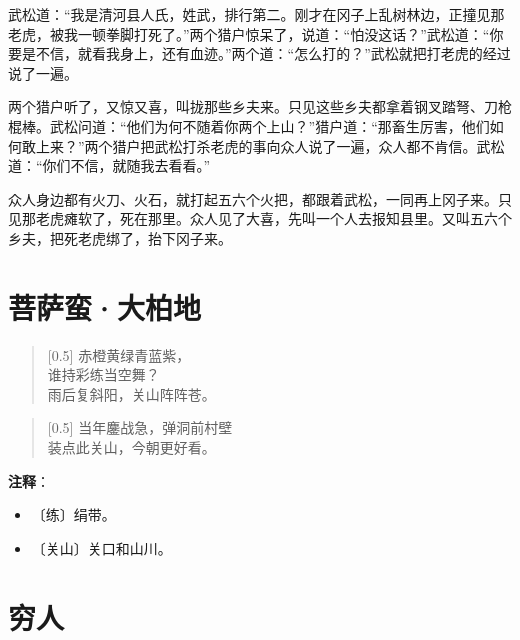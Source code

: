 \documentclass[12pt,UTF-8,openany]{ctexbook}
\begin{document}
\begin{Large}
    武松道：“我是清河县人氏，姓武，排行第二。刚才在冈子上乱树林边，正撞见那老虎，被我一顿拳脚打死了。”两个猎户惊呆了，说道：“怕没这话？”武松道：“你要是不信，就看我身上，还有血迹。”两个道：“怎么打的？”武松就把打老虎的经过说了一遍。
    
    两个猎户听了，又惊又喜，叫拢那些乡夫来。只见这些乡夫都拿着钢叉踏弩、刀枪棍棒。武松问道：“他们为何不随着你两个上山？”猎户道：“那畜生厉害，他们如何敢上来？”两个猎户把武松打杀老虎的事向众人说了一遍，众人都不肯信。武松道：“你们不信，就随我去看看。”
    
    众人身边都有火刀、火石，就打起五六个火把，都跟着武松，一同再上冈子来。只见那老虎瘫软了，死在那里。众人见了大喜，先叫一个人去报知县里。又叫五六个乡夫，把死老虎绑了，抬下冈子来。
    
\end{Large}

\chapter{菩萨蛮·大柏地}

\begin{Large}
    
    \begin{verse}[0.5\linewidth]
        赤橙黄绿青蓝紫， \\
        谁持彩练当空舞？ \\
        雨后复斜阳，关山阵阵苍。
    \end{verse}
    
    
    \begin{verse}[0.5\linewidth]
        当年鏖战急，弹洞前村壁 \\
        装点此关山，今朝更好看。
    \end{verse}
    
\end{Large}


\newpage

\textbf{注释}：

\vspace{-1em}

\begin{itemize}
    \setlength\itemsep{-0.2em}
    \item 〔练〕绢带。
    \item 〔关山〕关口和山川。
\end{itemize}

\chapter{穷人}
\end{document}
